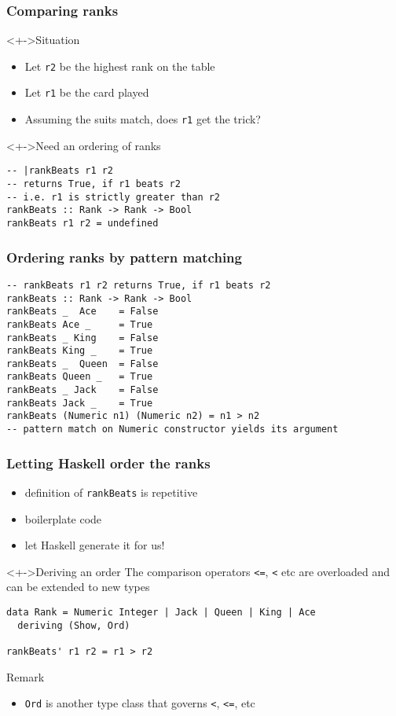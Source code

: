 \documentclass{beamer}
\begin{document}
\begin{frame}[fragile]
  \frametitle{Comparing ranks}
  \begin{block}<+->{Situation}
    \begin{itemize}
    \item Let \texttt{r2} be the highest rank on the table
    \item Let \texttt{r1} be the card played
    \item Assuming the suits match, does \texttt{r1} get the trick?
    \end{itemize}
  \end{block}
  \begin{block}<+->{Need an ordering of ranks}
\begin{lstlisting}
-- |rankBeats r1 r2
-- returns True, if r1 beats r2
-- i.e. r1 is strictly greater than r2
rankBeats :: Rank -> Rank -> Bool
rankBeats r1 r2 = undefined
\end{lstlisting}
  \end{block}
\end{frame}
\begin{frame}[fragile]
  \frametitle{Ordering ranks by pattern matching}
\begin{lstlisting}
-- rankBeats r1 r2 returns True, if r1 beats r2
rankBeats :: Rank -> Rank -> Bool
rankBeats _  Ace    = False
rankBeats Ace _     = True
rankBeats _ King    = False
rankBeats King _    = True
rankBeats _  Queen  = False
rankBeats Queen _   = True
rankBeats _ Jack    = False
rankBeats Jack _    = True
rankBeats (Numeric n1) (Numeric n2) = n1 > n2
-- pattern match on Numeric constructor yields its argument
\end{lstlisting}
\end{frame}

\begin{frame}[fragile]
  \frametitle{Letting Haskell order the ranks}
  \begin{itemize}
  \item definition of \texttt{rankBeats} is repetitive
  \item boilerplate code
  \item let Haskell generate it for us!
  \end{itemize}
  \begin{block}<+->{Deriving an order}
    The comparison operators \lstinline{<=}, \lstinline{<} etc are overloaded and can be extended to
    new types
\begin{lstlisting}
data Rank = Numeric Integer | Jack | Queen | King | Ace
  deriving (Show, Ord)

rankBeats' r1 r2 = r1 > r2
\end{lstlisting}
  \end{block}
  \begin{exampleblock}{Remark}
    \begin{itemize}
    \item \lstinline{Ord} is another type class that governs
      \lstinline{<}, \lstinline{<=}, etc
    \end{itemize}
  \end{exampleblock}
\end{frame}
\end{document}
